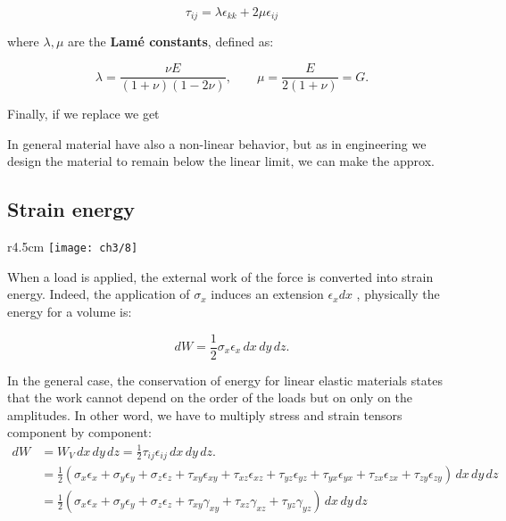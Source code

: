 			\begin{equation}
			\tau _{ij} = \lambda \epsilon _{kk} + 2\mu \epsilon _{ij}
			\end{equation}
			
			where $\lambda, \mu$ are the \textbf{Lamé constants}, defined as:
			
			\begin{equation}
			\lambda = \frac{\nu E}{(1+\nu) (1-2\nu) }, \qquad \mu = \frac{E}{2(1+\nu)} = G.
			\end{equation}
			
			Finally, if we replace we get 
			
			\begin{center}
			\end{center}
			
			In general material have also a non-linear behavior, but as in engineering we design the material to remain below the linear limit, we can make the approx. 
			
\subsection{Strain energy}
	\begin{wrapfigure}[8]{r}{4.5cm}
	\vspace{-5mm}	
	\texttt{[image: ch3/8]}
	\label{fig:3.8}
	\end{wrapfigure}	
	When a load is applied, the external work of the force is converted into strain energy. Indeed, the application of $\sigma _x$ induces an extension $\epsilon _x dx$ , physically the energy for a volume is:
	
	\begin{equation}
	dW = \frac{1}{2} \sigma _x \epsilon _x \, dx\, dy\, dz.
	\end{equation}
	
	In the general case, the conservation of energy for linear elastic materials states that the work cannot depend on the order of the loads but on only on the amplitudes. In other word, we have to multiply stress and strain tensors component by component:
	\begin{equation}
	\begin{aligned}
	dW &= W_V \, dx\, dy\, dz = \frac{1}{2} \tau _{ij} \epsilon _{ij} \, dx\, dy\, dz.\\
	&= \frac{1}{2} (\sigma _x \epsilon _x +\sigma _y \epsilon _y+\sigma _z \epsilon _z + \tau _{xy}\epsilon _{xy}+ \tau _{xz}\epsilon _{xz}+ \tau _{yz}\epsilon _{yz} + \tau _{yx}\epsilon _{yx}+ \tau _{zx}\epsilon _{zx}+ \tau _{zy}\epsilon _{zy}) \, dx\, dy\, dz\\
	&= \frac{1}{2} (\sigma _x \epsilon _x +\sigma _y \epsilon _y+\sigma _z \epsilon _z + \tau _{xy}\gamma _{xy}+ \tau _{xz}\gamma _{xz}+ \tau _{yz}\gamma _{yz}) \, dx\, dy\, dz
	\end{aligned}
	\end{equation}
	
